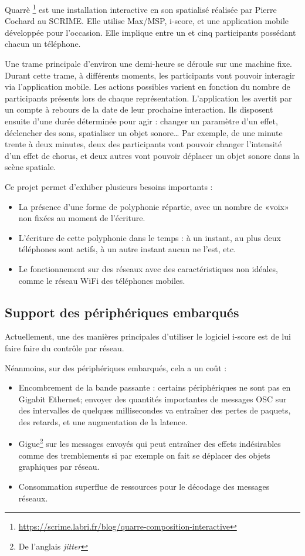 \documentclass{article}
\begin{document}
Quarrè
\footnote{\url{https://scrime.labri.fr/blog/quarre-composition-interactive}} est une installation interactive en son spatialisé réalisée par Pierre Cochard au SCRIME. Elle utilise Max/MSP, i-score, et une application mobile développée pour l'occasion. 
Elle implique entre un et cinq participants possédant chacun un téléphone.

Une trame principale d'environ une demi-heure se déroule sur une machine fixe.
Durant cette trame, à différents moments, les participants vont pouvoir interagir via l'application mobile. 
Les actions possibles varient en fonction du nombre de participants présents lors de chaque représentation.
L'application les avertit par un compte à rebours de la date de leur prochaine interaction. 
Ils disposent ensuite d'une durée déterminée pour agir : changer un paramètre d'un effet, déclencher des sons, spatialiser un objet sonore\dots{}
Par exemple, de une minute trente à deux minutes, deux des participants vont pouvoir changer l'intensité d'un effet de chorus, et deux autres vont pouvoir déplacer un objet sonore dans la scène spatiale. 

Ce projet permet d'exhiber plusieurs besoins importants : 
\begin{itemize}
    \item La présence d'une forme de polyphonie répartie, avec un nombre de «voix» non fixées au moment de l'écriture.
    \item L'écriture de cette polyphonie dans le temps : à un instant, au plus deux téléphones sont actifs, à  un autre instant aucun ne l'est, etc.
    \item Le fonctionnement sur des réseaux avec des caractéristiques non idéales, comme le réseau WiFi des téléphones mobiles.
\end{itemize}

\subsection{Support des périphériques embarqués}
Actuellement, une des manières principales d'utiliser le logiciel i-score est de lui faire faire du contrôle par réseau. 

Néanmoins, sur des périphériques embarqués, cela a un coût : 
\begin{itemize}
    \item Encombrement de la bande passante : certains périphériques ne sont pas en Gigabit Ethernet; envoyer des quantités importantes de messages OSC sur des intervalles de quelques millisecondes va entraîner des pertes de paquets, des retards, et une augmentation de la latence.
    \item Gigue\footnote{De l'anglais \textit{jitter}} sur les messages envoyés qui peut entraîner des effets indésirables comme des tremblements si par exemple on fait se déplacer des objets graphiques par réseau.
    \item Consommation superflue de ressources pour le décodage des messages réseaux.
\end{itemize}
\end{document}
